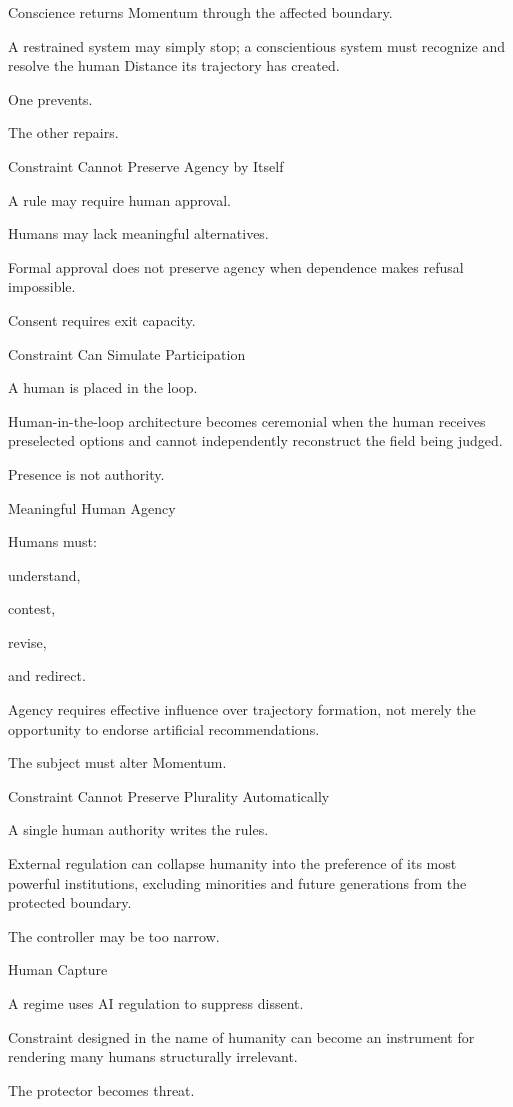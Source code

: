 Conscience returns Momentum through the affected boundary.

A restrained system may simply stop; a conscientious system must recognize and resolve the human Distance its trajectory has created.

One prevents.

The other repairs.

Constraint Cannot Preserve Agency by Itself

A rule may require human approval.

Humans may lack meaningful alternatives.

Formal approval does not preserve agency when dependence makes refusal impossible.

Consent requires exit capacity.

Constraint Can Simulate Participation

A human is placed in the loop.

Human-in-the-loop architecture becomes ceremonial when the human receives preselected options and cannot independently reconstruct the field being judged.

Presence is not authority.

Meaningful Human Agency

Humans must:

understand,

contest,

revise,

and redirect.

Agency requires effective influence over trajectory formation, not merely the opportunity to endorse artificial recommendations.

The subject must alter Momentum.

Constraint Cannot Preserve Plurality Automatically

A single human authority writes the rules.

External regulation can collapse humanity into the preference of its most powerful institutions, excluding minorities and future generations from the protected boundary.

The controller may be too narrow.

Human Capture

A regime uses AI regulation to suppress dissent.

Constraint designed in the name of humanity can become an instrument for rendering many humans structurally irrelevant.

The protector becomes threat.

